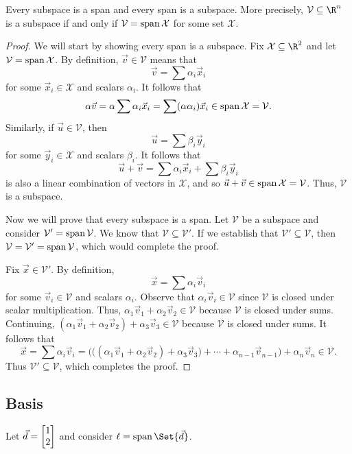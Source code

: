 	\begin{theorem}
		Every subspace is a span and every span is a subspace.  More precisely,
		$\mathcal V\subseteq \R^n$ is a subspace if and only if $\mathcal V=
		\operatorname{span}\mathcal X$ for some set $\mathcal X$.
	\end{theorem}
	\begin{proof}
		We will start by showing every span is a subspace.  Fix $\mathcal X\subseteq\R^2$
		and let
		$\mathcal V=\operatorname{span}\mathcal X$. By definition, $\vec v\in\mathcal V$ means that
		\[
			\vec v=\sum \alpha_i\vec x_i
		\]
		for some $\vec x_i\in\mathcal X$ and scalars $\alpha_i$. It follows that
		\[
			\alpha\vec v=\alpha\sum \alpha_i\vec x_i = \sum (\alpha\alpha_i)\vec x_i\in
			\operatorname{span}\mathcal X=\mathcal V.
		\]
		Similarly, if $\vec u\in\mathcal V$, then
		\[
			\vec u=\sum\beta_i\vec y_i
		\]
		for some $\vec y_i\in\mathcal X$ and scalars $\beta_i$. It follows that
		\[
			\vec u+\vec v=\sum\alpha_i\vec x_i + \sum\beta_i\vec y_i
		\]
		is also a linear combination of vectors in $\mathcal X$, and so $\vec u+\vec v\in
		\operatorname{span}\mathcal X=\mathcal V$. Thus, $\mathcal V$ is a subspace.

		Now we will prove that every subspace is a span. Let $\mathcal V$ be a subspace
		and consider $\mathcal V'=\operatorname{span}\mathcal V$. We know that 
		$\mathcal V\subseteq \mathcal V'$. If we establish that $\mathcal V'\subseteq\mathcal V$,
		then $\mathcal V=\mathcal V'=\operatorname{span}\mathcal V$, which would complete the proof.

		Fix $\vec x\in\mathcal V'$. By definition, 
		\[
			\vec x=\sum \alpha_i\vec v_i
		\]
		for some $\vec v_i\in\mathcal V$ and scalars $\alpha_i$. Observe that 
		$\alpha_i\vec v_i\in\mathcal V$ since $\mathcal V$ is closed under scalar
		multiplication. Thus, $\alpha_1\vec v_1+\alpha_2\vec v_2\in\mathcal V$
		because $\mathcal V$ is closed under sums. Continuing, 
		$(\alpha_1\vec v_1+\alpha_2\vec v_2)+\alpha_3\vec v_3\in\mathcal V$ because
		$\mathcal V$ is closed under sums. It follows that
		\[
			\vec x=\sum \alpha_i\vec v_i
			=\Big(\big((\alpha_1\vec v_1+\alpha_2\vec v_2)
			+\alpha_3\vec v_3\big)+\cdots+\alpha_{n-1}\vec v_{n-1} \Big)
			+\alpha_n\vec v_n\in\mathcal V.
		\]
		Thus $\mathcal V'\subseteq\mathcal V$, which completes the proof.
	\end{proof}


\subsection{Basis}
	Let $\vec d=\mat{1\\2}$ and consider $\ell=\Span\Set{\vec d}$.

